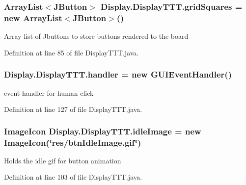 \subsubsection[{grid\+Squares}]{\setlength{\rightskip}{0pt plus 5cm}Array\+List$<$J\+Button$>$ Display.\+Display\+T\+T\+T.\+grid\+Squares = new Array\+List$<$J\+Button$>$()\hspace{0.3cm}{\ttfamily [private]}}\label{class_display_1_1_display_t_t_t_af2ce89b88ce5f8ccae426f4f273d52aa}
Array list of Jbuttons to store buttons rendered to the board 

Definition at line 85 of file Display\+T\+T\+T.\+java.

\hypertarget{class_display_1_1_display_t_t_t_a834294acca3e75ec3d75e52ecd6028bc}{}
\subsubsection[{handler}]{ Display.\+Display\+T\+T\+T.\+handler = new {\bf G\+U\+I\+Event\+Handler}()\hspace{0.3cm}{\ttfamily [private]}}\label{class_display_1_1_display_t_t_t_a834294acca3e75ec3d75e52ecd6028bc}
event handler for human click 

Definition at line 127 of file Display\+T\+T\+T.\+java.

\hypertarget{class_display_1_1_display_t_t_t_a9f22db838fa2492c00c8466efb8eebd5}{}
\subsubsection[{idle\+Image}]{\setlength{\rightskip}{0pt plus 5cm}Image\+Icon Display.\+Display\+T\+T\+T.\+idle\+Image = new Image\+Icon(\char`\"{}res/btn\+Idle\+Image.\+gif\char`\"{})\hspace{0.3cm}{\ttfamily [private]}}\label{class_display_1_1_display_t_t_t_a9f22db838fa2492c00c8466efb8eebd5}
Holds the idle gif for button animation 

Definition at line 103 of file Display\+T\+T\+T.\+java.

\hypertarget{class_display_1_1_display_t_t_t_a713fdaab41d88af675c9f54dfcdb87a2}{}
